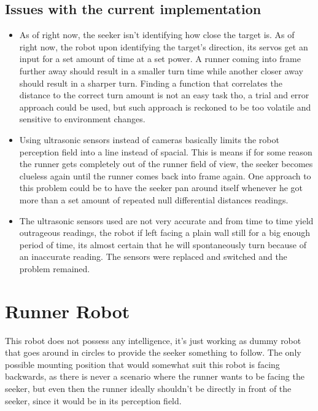 \documentclass[sigconf,nonacm]{acmart}
\begin{document}
\subsection{Issues with the current implementation}
\label{chap: issues}
\begin{itemize}
      \item 
      As of right now, the seeker isn't identifying how close the target is. As of
      right now, the robot upon identifying the target's direction, its servos get an
      input for a set amount of time at a set power. A runner coming into frame
      further away should result in a smaller turn time while another closer away
      should result in a sharper turn.
      Finding a function that correlates the distance to the correct turn amount
      is not an easy task tho, a trial and error approach could be used, but
      such approach is reckoned to be too volatile and sensitive to environment changes.

      \item Using ultrasonic sensors instead of cameras basically limits the
      robot perception field into a line instead of spacial. This is means if for
      some reason the runner gets completely out of the runner field of view,
      the seeker becomes clueless again until the runner comes back into frame
      again.
      One approach to this problem could be to have the seeker pan around itself
      whenever he got more than a set amount of repeated null differential
      distances readings.

      \item The ultrasonic sensors used are not very accurate and from time to
      time yield outrageous readings, the robot if left facing a plain wall
      still for a big enough period of time, its almost certain that he will
      spontaneously turn because of an inaccurate reading. The sensors were
      replaced and switched and the problem remained.
\end{itemize}



\section{Runner Robot}

This robot does not possess any intelligence, it's just working as dummy robot
that goes around in circles to provide the seeker something to follow. The only
possible mounting position that would somewhat suit this robot is facing
backwards, as there is never a scenario where the runner wants to be facing the
seeker, but even then the runner ideally shouldn't be directly in front of the 
seeker, since it would be in its perception field. 
\end{document}
